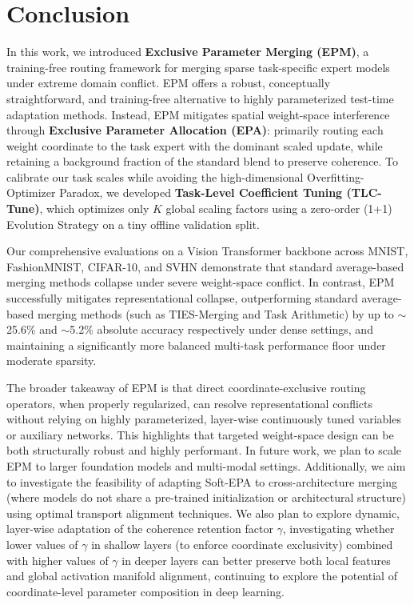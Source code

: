\section{Conclusion}
\label{submission:conclusion}

In this work, we introduced \textbf{Exclusive Parameter Merging (EPM)}, a training-free routing framework for merging sparse task-specific expert models under extreme domain conflict. EPM offers a robust, conceptually straightforward, and training-free alternative to highly parameterized test-time adaptation methods. Instead, EPM mitigates spatial weight-space interference through \textbf{Exclusive Parameter Allocation (EPA)}: primarily routing each weight coordinate to the task expert with the dominant scaled update, while retaining a background fraction of the standard blend to preserve coherence. To calibrate our task scales while avoiding the high-dimensional Overfitting-Optimizer Paradox, we developed \textbf{Task-Level Coefficient Tuning (TLC-Tune)}, which optimizes only $K$ global scaling factors using a zero-order (1+1) Evolution Strategy on a tiny offline validation split.

Our comprehensive evaluations on a Vision Transformer backbone across MNIST, FashionMNIST, CIFAR-10, and SVHN demonstrate that standard average-based merging methods collapse under severe weight-space conflict. In contrast, EPM successfully mitigates representational collapse, outperforming standard average-based merging methods (such as TIES-Merging and Task Arithmetic) by up to $\sim$25.6\% and $\sim$5.2\% absolute accuracy respectively under dense settings, and maintaining a significantly more balanced multi-task performance floor under moderate sparsity.

The broader takeaway of EPM is that direct coordinate-exclusive routing operators, when properly regularized, can resolve representational conflicts without relying on highly parameterized, layer-wise continuously tuned variables or auxiliary networks. This highlights that targeted weight-space design can be both structurally robust and highly performant. In future work, we plan to scale EPM to larger foundation models and multi-modal settings. Additionally, we aim to investigate the feasibility of adapting Soft-EPA to cross-architecture merging (where models do not share a pre-trained initialization or architectural structure) using optimal transport alignment techniques. We also plan to explore dynamic, layer-wise adaptation of the coherence retention factor $\gamma$, investigating whether lower values of $\gamma$ in shallow layers (to enforce coordinate exclusivity) combined with higher values of $\gamma$ in deeper layers can better preserve both local features and global activation manifold alignment, continuing to explore the potential of coordinate-level parameter composition in deep learning.
